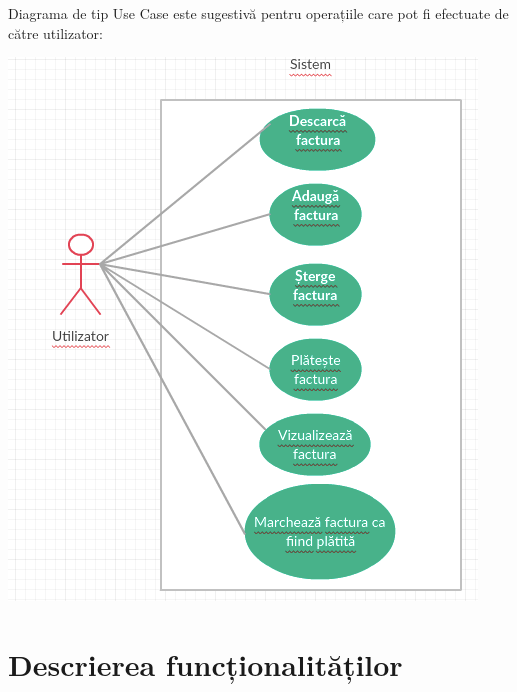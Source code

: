 \documentclass[12pt]{book}
\begin{document}
Diagrama de tip Use Case este sugestivă pentru operațiile care pot fi efectuate de către utilizator:
\begin{center}
	\includegraphics{UseCaseDiagram}
\end{center}

\section{Descrierea funcționalităților}
\end{document}

